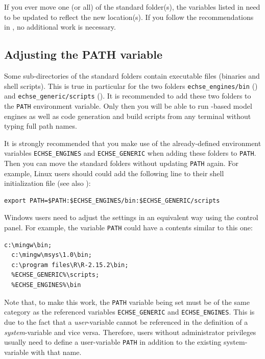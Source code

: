 If you ever move one (or all) of the  standard folder(s), the variables listed in  need to be updated to reflect the new location(s). If you follow the recommendations in , no additional work is necessary.

\subsection{Adjusting the PATH variable} \label{sec:install:env:path}

Some sub-directories of the  standard folders contain executable files (binaries and shell scripts). This is true in particular for the two folders \verb!echse_engines/bin! () and \verb!echse_generic/scripts! (). It is recommended to add these two folders to the \verb!PATH! environment variable. Only then you will be able to run -based model engines as well as code generation and build scripts from any terminal without typing full path names.

It is strongly recommended that you make use of the already-defined environment variables \verb!ECHSE_ENGINES! and \verb!ECHSE_GENERIC! when adding these folders to \verb!PATH!. Then you can move the  standard folders without updating \verb!PATH! again. For example, Linux users should could add the following line to their shell initialization file (see also ):

\begin{lstlisting}[style=shell]
  export PATH=$PATH:$ECHSE_ENGINES/bin:$ECHSE_GENERIC/scripts
\end{lstlisting}

Windows users need to adjust the settings in an equivalent way using the control panel. For example, the variable \verb!PATH! could have a contents similar to this one:
\begin{lstlisting}[style=shell]
  c:\mingw\bin;
  c:\mingw\msys\1.0\bin;
  c:\program files\R\R-2.15.2\bin;
  %ECHSE_GENERIC%\scripts;
  %ECHSE_ENGINES%\bin
\end{lstlisting}

Note that, to make this work, the \verb!PATH! variable being set must be of the same category as the referenced variables \verb!ECHSE_GENERIC! and \verb!ECHSE_ENGINES!. This is due to the fact that a \emph{user}-variable cannot be referenced in the definition of a \emph{system}-variable and vice versa. Therefore, users without administrator privileges usually need to define a user-variable \verb!PATH! in addition to the existing system-variable with that name.

